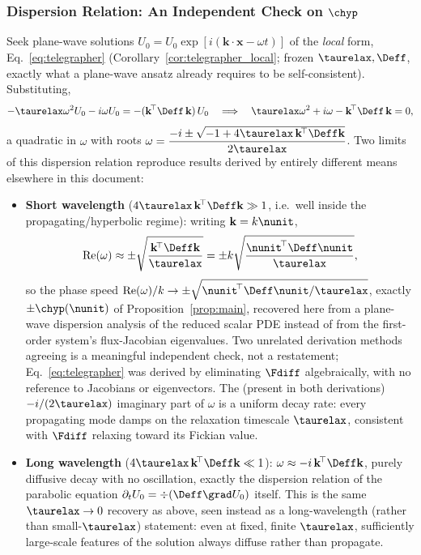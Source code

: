 \subsubsection{Dispersion Relation: An Independent Check on $\chyp$}
Seek plane-wave solutions $U_0=\hat U_0\exp[i(\mathbf k\cdot\mathbf x-\omega t)]$
of the \emph{local} form, Eq.~\eqref{eq:telegrapher}
(Corollary~\ref{cor:telegrapher_local}; frozen $\taurelax,\Deff$, exactly
what a plane-wave ansatz already requires to be self-consistent).
Substituting,
\begin{equation}
  -\taurelax\omega^2 U_0 - i\omega U_0 = -(\mathbf k^{\!\top}\Deff\,\mathbf k)\,U_0
  \quad\Longrightarrow\quad
  \taurelax\omega^2 + i\omega - \mathbf k^{\!\top}\Deff\,\mathbf k = 0 ,
\end{equation}
a quadratic in $\omega$ with roots
$\omega = \dfrac{-i \pm \sqrt{-1+4\taurelax\,\mathbf k^{\!\top}\Deff\mathbf k}}{2\taurelax}$.
Two limits of this dispersion relation reproduce results derived by
entirely different means elsewhere in this document:
\begin{itemize}
\item \textbf{Short wavelength} ($4\taurelax\,\mathbf k^{\!\top}\Deff\mathbf k\gg1$,
  i.e.\ well inside the propagating/hyperbolic regime): writing
  $\mathbf k=k\nunit$,
  \begin{equation}
    \mathrm{Re}(\omega) \approx \pm\sqrt{\frac{\mathbf k^{\!\top}\Deff\mathbf k}{\taurelax}}
    = \pm k\sqrt{\frac{\nunit^{\!\top}\Deff\nunit}{\taurelax}} ,
  \end{equation}
  so the phase speed $\mathrm{Re}(\omega)/k \to \pm\sqrt{\nunit^{\!\top}\Deff\nunit/\taurelax}$,
  exactly $\pm\chyp(\nunit)$ of Proposition~\ref{prop:main}, recovered
  here from a plane-wave dispersion analysis of the reduced scalar PDE
  instead of from the first-order system's flux-Jacobian eigenvalues. Two
  unrelated derivation methods agreeing is a meaningful independent check,
  not a restatement; Eq.~\eqref{eq:telegrapher} was derived by
  eliminating $\Fdiff$ algebraically, with no reference to Jacobians or
  eigenvectors. The (present in both derivations) $-i/(2\taurelax)$
  imaginary part of $\omega$ is a uniform decay rate: every propagating
  mode damps on the relaxation timescale $\taurelax$, consistent with
  $\Fdiff$ relaxing toward its Fickian value.
\item \textbf{Long wavelength} ($4\taurelax\,\mathbf k^{\!\top}\Deff\mathbf k\ll1$):
  $\omega\approx-i\,\mathbf k^{\!\top}\Deff\mathbf k$, purely diffusive
  decay with no oscillation, exactly the dispersion relation of the
  parabolic equation $\partial_tU_0=\div(\Deff\grad U_0)$ itself. This is
  the same $\taurelax\to0$ recovery as above, seen instead as a
  long-wavelength (rather than small-$\taurelax$) statement: even at
  fixed, finite $\taurelax$, sufficiently large-scale features of the
  solution always diffuse rather than propagate.
\end{itemize}

